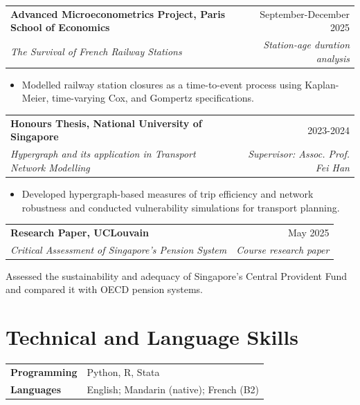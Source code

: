 \documentclass[11pt,letterpaper]{article}
\makeatletter
\newcommand{\entry}[4]{%
  \begin{tabularx}{\textwidth}{@{}Xr@{}}
    \textbf{#1} & \textcolor{muted}{#2} \\
    \textit{#3} & \textit{\textcolor{muted}{#4}}
  \end{tabularx}\vspace{2pt}
}
\makeatother
\begin{document}
\entry{Advanced Microeconometrics Project, Paris School of Economics}{September-December 2025}{The Survival of French Railway Stations}{Station-age duration analysis}
\begin{itemize}
  \item Modelled railway station closures as a time-to-event process using Kaplan-Meier, time-varying Cox, and Gompertz specifications.
\end{itemize}

\entry{Honours Thesis, National University of Singapore}{2023-2024}{Hypergraph and its application in Transport Network Modelling}{Supervisor: Assoc. Prof. Fei Han}
\begin{itemize}
  \item Developed hypergraph-based measures of trip efficiency and network robustness and conducted vulnerability simulations for transport planning.
\end{itemize}

\entry{Research Paper, UCLouvain}{May 2025}{Critical Assessment of Singapore's Pension System}{Course research paper}
Assessed the sustainability and adequacy of Singapore's Central Provident Fund and compared it with OECD pension systems.

\section*{Technical and Language Skills}
\begin{tabularx}{\textwidth}{@{}lX@{}}
\textbf{Programming} & Python, R, Stata \\
\textbf{Languages} & English; Mandarin (native); French (B2)
\end{tabularx}
\end{document}
